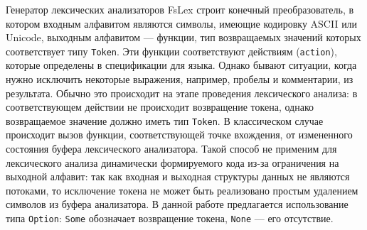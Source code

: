 \documentclass[10pt, conference, compsocconf]{IEEEtran}
\begin{document}
Генератор лексических анализаторов FsLex строит конечный преобразователь, в котором входным алфавитом являются символы, имеющие кодировку ASCII или Unicode, выходным алфавитом --- функции, тип возвращаемых значений которых соответствует типу \verb|Token|. Эти функции соответствуют действиям (\verb|action|), которые определены в спецификации для языка.  Однако бывают ситуации, когда нужно исключить некоторые выражения, например, пробелы и комментарии, из результата. Обычно это происходит на этапе проведения лексического анализа: в соответствующем действии не происходит возвращение токена, однако возвращаемое значение должно иметь тип \verb|Token|.  В классическом случае происходит вызов функции, соответствующей точке вхождения, от измененного состояния буфера лексического анализатора. Такой способ не применим для лексического анализа динамически формируемого кода из-за ограничения на выходной алфавит: так как входная и выходная структуры данных не являются потоками, то исключение токена не может быть реализовано простым удалением символов из буфера анализатора. В данной работе предлагается использование типа \verb|Option|: \verb|Some| обозначает возвращение токена, \verb|None| --- его отсутствие. 
\end{document}

